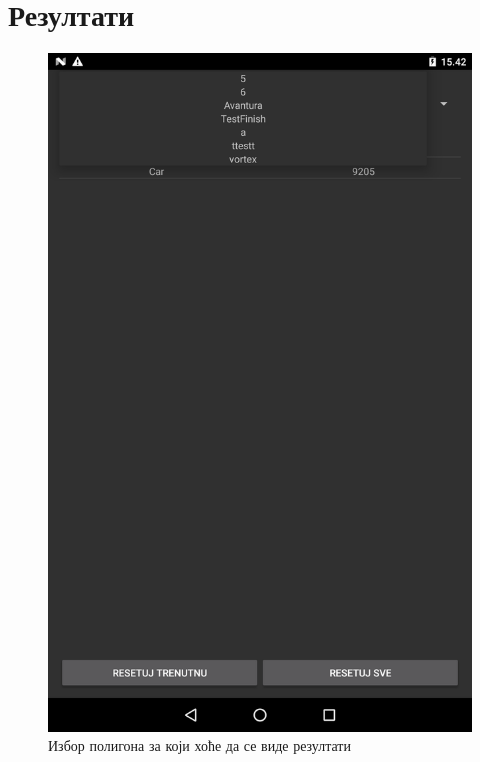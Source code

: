 \section{Резултати}
\begin{figure}[htb!]
\begin{center}
\includegraphics[scale=.1]{pictures/statistics/Choose}
\caption{Избор полигона за који хоће да се виде резултати}\label{fig:statisticChoose}
\end{center}
\end{figure}

